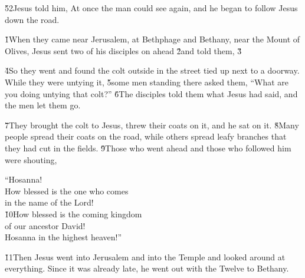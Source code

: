 \v{52}Jesus told him,  At once the man could see again, and he began to follow Jesus down the road.

\v{1}When they came near Jerusalem, at Bethphage and Bethany, near the Mount of Olives, Jesus sent two of his disciples on ahead \v{2}and told them,   \v{3}

\v{4}So they went and found the colt outside in the street tied up next to a doorway. While they were untying it, \v{5}some men standing there asked them, ``What are you doing untying that colt?'' \v{6}The disciples told them what Jesus had said, and the men let them go.

\v{7}They brought the colt to Jesus, threw their coats on it, and he sat on it. \v{8}Many people spread their coats on the road, while others spread leafy branches that they had cut in the fields. \v{9}Those who went ahead and those who followed him were shouting,

\begin{poetry}
\poeml ``Hosanna! \\
\poeml How blessed is the one who comes \\
\poemll    in the name of the Lord! \\
\poeml \v{10}How blessed is the coming kingdom \\
\poemll    of our ancestor David! \\
\poeml Hosanna in the highest heaven!''
\end{poetry}

\v{11}Then Jesus went into Jerusalem and into the Temple and looked around at everything. Since it was already late, he went out with the Twelve to Bethany.

